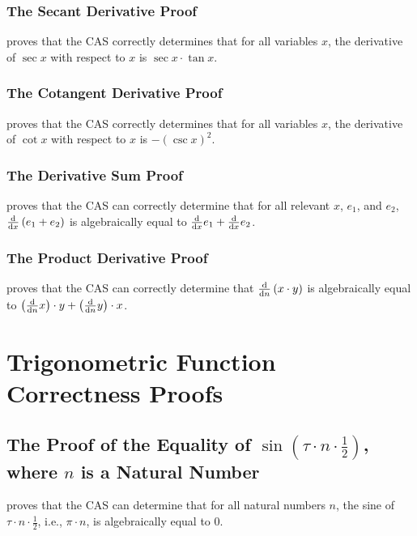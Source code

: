 \documentclass{report}
\begin{document}
\subsubsection{The Secant Derivative Proof}
  proves that the  CAS correctly determines that for all variables \(x\), the derivative of \(\sec x\) with respect to \(x\) is \(\sec x \cdot \tan x\).

\subsubsection{The Cotangent Derivative Proof}
  proves that the  CAS correctly determines that for all variables \(x\), the derivative of \(\cot x\) with respect to \(x\) is \(- \left(\csc x\right)^2\).

\subsubsection{The Derivative Sum Proof}
  proves that the  CAS can correctly determine that for all relevant \(x\), \(e_1\), and \(e_2\), \(\derivative{x} \left(e_1 + e_2\right)\) is algebraically equal to \(\derivative{x} e_1 + \derivative{x} e_2\).

\subsubsection{The Product Derivative Proof}
  proves that the  CAS can correctly determine that \(\derivative{n} \left(x \cdot y\right)\) is algebraically equal to \(\left(\derivative{n} x\right) \cdot y + \left(\derivative{n} y\right) \cdot x\).

\section{Trigonometric Function Correctness Proofs}
\subsection{The Proof of the Equality of \(\operatorname{sin} \left(\tau \cdot n \cdot \frac12\right)\), where \(n\) is a Natural Number}
  proves that the  CAS can determine that for all natural numbers \(n\), the sine of \(\tau \cdot n \cdot \frac12\), i.e., \(\pi \cdot n\), is algebraically equal to \(0\).
\end{document}
